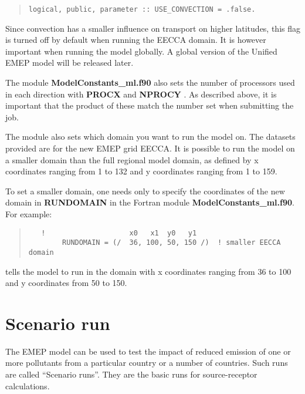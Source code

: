 \begin{small}
\begin{quote}
  \begin{verbatim}
logical, public, parameter :: USE_CONVECTION = .false. 
  \end{verbatim}
\end{quote}
\end{small}

Since convection has a smaller influence on transport on higher latitudes, this flag is turned off by 
default when running the EECCA domain. It is however important when running the model globally. A global version 
of the Unified EMEP model will be released later. 

The module {\bf ModelConstants\_ml.f90 } also sets the number of processors used in each direction with 
{\bf PROCX } and {\bf NPROCY }. As described above, it is important that the product of these match the number set 
when submitting the job. 


The module also sets which domain you want to run the model on. 
The datasets provided are for the new EMEP grid EECCA. 
It is possible to run the model on a smaller domain than the full
regional model domain, as defined by  x coordinates ranging
from 1 to 132 and y coordinates ranging from 1 to 159. 

To set a smaller domain, one needs only to specify the
coordinates of the new domain in {\bf RUNDOMAIN} in the Fortran module
 {\bf ModelConstants\_ml.f90}. For example:

\begin{quote}

\begin{verbatim}
   !                    x0   x1  y0   y1
        RUNDOMAIN = (/  36, 100, 50, 150 /)  ! smaller EECCA domain
\end{verbatim}
\end{quote}

tells the model to run in the domain with x coordinates ranging from
36 to 100 and y coordinates from 50 to 150.\\ 


\section{Scenario run}
\label{sec:scenrun}

The EMEP  model can be used to test the impact of reduced emission of
one or more pollutants from a particular country or a number of
countries.  Such runs are called ``Scenario runs''. They are the basic
runs for source-receptor calculations.


